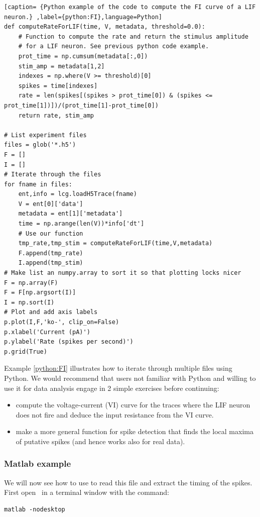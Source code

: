 \renewcommand{\lstlistingname}{Example}
\begin{lstlisting}[caption= {Python example of the code to compute the FI curve of a LIF neuron.} ,label={python:FI},language=Python]
def computeRateForLIF(time, V, metadata, threshold=0.0):
    # Function to compute the rate and return the stimulus amplitude
    # for a LIF neuron. See previous python code example.
    prot_time = np.cumsum(metadata[:,0])
    stim_amp = metadata[1,2]
    indexes = np.where(V >= threshold)[0]
    spikes = time[indexes]
    rate = len(spikes[(spikes > prot_time[0]) & (spikes <= prot_time[1])])/(prot_time[1]-prot_time[0])
    return rate, stim_amp

# List experiment files
files = glob('*.h5')
F = []
I = []
# Iterate through the files
for fname in files:
    ent,info = lcg.loadH5Trace(fname)
    V = ent[0]['data']
    metadata = ent[1]['metadata']
    time = np.arange(len(V))*info['dt']
    # Use our function
    tmp_rate,tmp_stim = computeRateForLIF(time,V,metadata)
    F.append(tmp_rate)
    I.append(tmp_stim)
# Make list an numpy.array to sort it so that plotting locks nicer
F = np.array(F)
F = F[np.argsort(I)]
I = np.sort(I)
# Plot and add axis labels
p.plot(I,F,'ko-', clip_on=False)
p.xlabel('Current (pA)')
p.ylabel('Rate (spikes per second)')
p.grid(True)
\end{lstlisting}

Example \ref{python:FI} illustrates how to iterate through multiple files using Python. We would recommend that users not familiar with Python and willing to use it for data analysis engage in 2 simple exercises before continuing:
\begin{itemize}
\item{} compute the voltage-current (VI) curve for the traces where the LIF neuron does not fire and deduce the input resistance from the VI curve.
\item{} make a more general function for spike detection that finds the local maxima  of putative spikes (and hence works also for real data). 
\end{itemize} 

\subsubsection{Matlab example}

We will now see how to use \textbf{\matlab} to read this file and extract the timing of the spikes. 
First open \matlab\ in a terminal window with the command: 
\begin{lstlisting} 
matlab -nodesktop 
\end{lstlisting}

